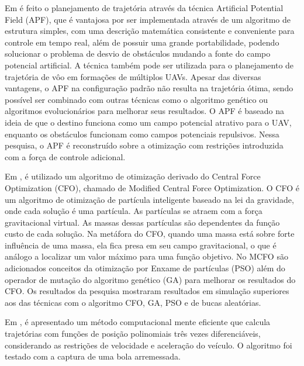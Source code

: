 Em \cite{chen2016uav} é feito o planejamento de trajetória através da técnica Artificial Potential Field (APF), que é vantajosa por ser implementada através de um algoritmo de estrutura simples, com uma descrição matemática consistente e conveniente para controle em tempo real, além de possuir uma grande portabilidade, podendo solucionar o problema de desvio de obstáculos mudando a fonte do campo potencial artificial. A técnica também pode ser utilizada para o planejamento de trajetória de vôo em formações de múltiplos UAVs. Apesar das diversas vantagens, o APF na configuração padrão não resulta na trajetória ótima, sendo possível ser combinado com outras técnicas como o algoritmo genético ou algoritmos evolucionários para melhorar seus resultados. O APF é baseado na ideia de que o destino funciona como um campo potencial atrativo para o UAV, enquanto os obstáculos funcionam como campos potenciais repulsivos. Nessa pesquisa, o APF é reconstruído sobre a otimização com restrições introduzida com a força de controle adicional.

Em \cite{chen2016modified} , é utilizado um algoritmo de otimização derivado do Central Force Optimization (CFO), chamado de Modified Central Force Optimization. O CFO é um algoritmo de otimização de partícula inteligente baseado na lei da gravidade, onde cada solução é uma partícula. As partículas se atraem com a força gravitacional virtual. As massas dessas partículas são dependentes da função custo de cada solução. Na metáfora do CFO, quando uma massa está sobre forte influência de uma massa, ela fica presa em seu campo gravitacional, o que é análogo a localizar um valor máximo para uma função objetivo.
No MCFO são adicionados conceitos da otimização por Enxame de partículas (PSO) além do operador de mutação do algoritmo genético (GA) para melhorar os resultados do CFO. Os resultados da pesquisa mostraram resultados em simulação superiores aos das técnicas com o algoritmo CFO, GA, PSO e de bucas aleatórias.

Em \cite{Mueller2015a}, é apresentado um método computacional mente eficiente que calcula trajetórias com funções de posição polinomiais três vezes diferenciáveis, considerando as restrições de velocidade e aceleração do veículo. O algoritmo foi testado com a captura de uma bola arremessada.
 

